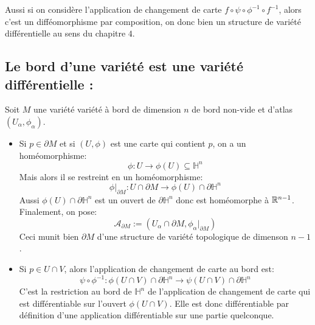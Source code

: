      Aussi si on considère l'application de changement de carte \(f \circ \psi \circ \phi^{-1} \circ f^{-1}\), alors c'est un difféomorphisme par composition, on donc bien un structure de variété différentielle au sens du chapitre \( 4 \).
   \subsection*{Le bord d'une variété est une variété différentielle {:}}
      Soit \( M \) une variété variété à bord de dimension \( n \) de bord non-vide et d'atlas \( (U_\alpha, \phi_\alpha) \).
      \begin{itemize}
         \item Si \( p \in \partial M \) et si \( (U, \phi) \) est une carte qui contient \( p \), on a un homéomorphisme:
         \[ 
            \phi : U \longrightarrow \phi(U) \subseteq \mathbb{H}^n 
         \]
         Mais alors il se restreint en un homéomorphisme:
         \[ 
            \phi|_{\partial M} : U \cap \partial M \longrightarrow \phi(U) \cap \partial \mathbb{H}^n
         \]
         Aussi \( \phi(U) \cap \partial \mathbb{H}^n \) est un ouvert de \( \partial \mathbb{H}^n \) donc est homéomorphe à \( \mathbb{R}^{n-1} \). Finalement, on pose:
         \[ 
            \mathcal{A}_{ \partial M} :=  (U_\alpha \cap  \partial M, \phi_\alpha|_{\partial M})
         \]
         Ceci munit bien \( \partial M \) d'une structure de variété topologique de dimenson \( n-1 \).
         \item Si \( p \in U \cap V\), alors l'application de changement de carte au bord est:
         \[ 
            \psi \circ \phi^{-1} : \phi(U \cap V) \cap \partial \mathbb{H}^n \longrightarrow \psi(U \cap V) \cap \partial \mathbb{H}^n
         \]
         C'est la restriction au bord de \( \mathbb{H}^n \) de l'application de changement de carte qui est différentiable sur l'ouvert \( \phi(U \cap V) \). Elle est donc différentiable par définition d'une application différentiable sur une partie quelconque.
      \end{itemize}
   \pagebreak
